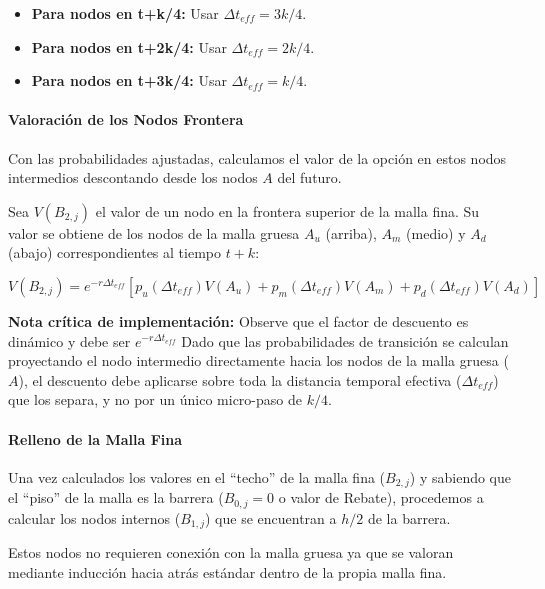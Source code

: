 \begin{itemize} 
  \item \textbf{Para nodos en t+k/4:} Usar $\Delta t_{eff}=3k/4$. 

  \item \textbf{Para nodos en t+2k/4:} Usar $\Delta t_{eff}=2k/4$. 
  
  \item \textbf{Para nodos en t+3k/4:} Usar $\Delta t_{eff}=k/4$. 
\end{itemize}

\paragraph{Valoración de los Nodos Frontera} 

Con las probabilidades ajustadas, calculamos el valor de la opción en estos nodos intermedios descontando desde los nodos $A$ del futuro.

Sea $V(B_{2,j})$ el valor de un nodo en la frontera superior de la malla fina. Su valor se obtiene de los nodos de la malla gruesa $A_u$ (arriba), $A_m$ (medio) y $A_d$ (abajo) correspondientes al tiempo $t+k$:

\begin{equation} 
  V(B_{2,j}) = e^{-r\Delta t_{eff}} \left[ p_u(\Delta t_{eff}) V(A_u) + p_m(\Delta t_{eff}) V(A_m) + p_d(\Delta t_{eff}) V(A_d) \right] \label{eq:amm_interface_val} 
\end{equation}

\textbf{Nota crítica de implementación:} Observe que el factor de descuento es dinámico y debe ser $e^{-r\Delta t_{eff}}$ Dado que las probabilidades de transición se calculan proyectando el nodo intermedio directamente hacia los nodos de la malla gruesa ($A$), el descuento debe aplicarse sobre toda la distancia temporal efectiva ($\Delta t_{eff}$) que los separa, y no por un único micro-paso de $k/4$.

\paragraph{Relleno de la Malla Fina} 

Una vez calculados los valores en el ``techo'' de la malla fina ($B_{2,j}$) y sabiendo que el ``piso'' de la malla es la barrera ($B_{0,j}=0$ o valor de Rebate), procedemos a calcular los nodos internos ($B_{1,j}$) que se encuentran a $h/2$ de la barrera.

Estos nodos no requieren conexión con la malla gruesa ya que se valoran mediante inducción hacia atrás estándar dentro de la propia malla fina.

